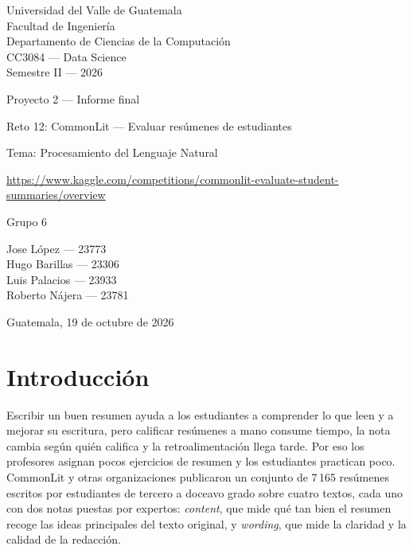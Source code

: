 \documentclass[11pt,a4paper]{article}
\begin{document}
\begin{titlepage}
\centering
{\large Universidad del Valle de Guatemala\\
Facultad de Ingeniería\\
Departamento de Ciencias de la Computación\\
CC3084 --- Data Science\\
Semestre II --- 2026\par}

\vspace{2.2cm}

{\LARGE Proyecto 2 --- Informe final\par}
\vspace{0.8cm}
{\large Reto 12: CommonLit --- Evaluar resúmenes de estudiantes\par}
\vspace{0.3cm}
{\normalsize Tema: Procesamiento del Lenguaje Natural\par}
\vspace{0.3cm}
{\small \url{https://www.kaggle.com/competitions/commonlit-evaluate-student-summaries/overview}\par}

\vspace{1.5cm}
{\Large Grupo 6\par}
\vspace{0.4cm}
Jose López --- 23773\\
Hugo Barillas --- 23306\\
Luis Palacios --- 23933\\
Roberto Nájera --- 23781

\vfill
Guatemala, 19 de octubre de 2026
\end{titlepage}

\tableofcontents
\newpage
\section{Introducción}

Escribir un buen resumen ayuda a los estudiantes a comprender lo que leen y a mejorar su escritura, pero calificar resúmenes a mano consume tiempo, la nota cambia según quién califica y la retroalimentación llega tarde. Por eso los profesores asignan pocos ejercicios de resumen y los estudiantes practican poco. CommonLit y otras organizaciones publicaron un conjunto de 7\,165 resúmenes escritos por estudiantes de tercero a doceavo grado sobre cuatro textos, cada uno con dos notas puestas por expertos: \emph{content}, que mide qué tan bien el resumen recoge las ideas principales del texto original, y \emph{wording}, que mide la claridad y la calidad de la redacción.
\end{document}
